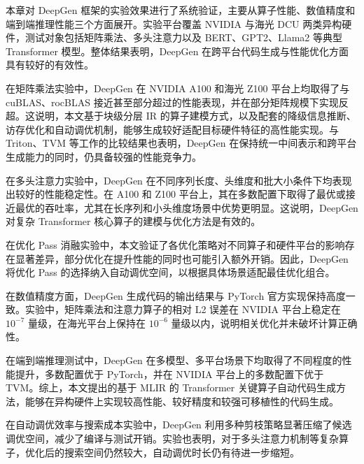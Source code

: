 本章对 DeepGen 框架的实验效果进行了系统验证，主要从算子性能、数值精度和端到端推理性能三个方面展开。实验平台覆盖 NVIDIA 与海光 DCU 两类异构硬件，测试对象包括矩阵乘法、多头注意力以及 BERT、GPT2、Llama2 等典型 Transformer 模型。整体结果表明，DeepGen 在跨平台代码生成与性能优化方面具有较好的有效性。

在矩阵乘法实验中，DeepGen 在 NVIDIA A100 和海光 Z100 平台上均取得了与 cuBLAS、rocBLAS 接近甚至部分超过的性能表现，并在部分矩阵规模下实现反超。这说明，本文基于块级分层 IR 的算子建模方式，以及配套的降级信息推断、访存优化和自动调优机制，能够生成较好适配目标硬件特征的高性能实现。与 Triton、TVM 等工作的比较结果也表明，DeepGen 在保持统一中间表示和跨平台生成能力的同时，仍具备较强的性能竞争力。

在多头注意力实验中，DeepGen 在不同序列长度、头维度和批大小条件下均表现出较好的性能稳定性。在 A100 和 Z100 平台上，其在多数配置下取得了最优或接近最优的吞吐率，尤其在长序列和小头维度场景中优势更明显。这说明，DeepGen 对复杂 Transformer 核心算子的建模与优化方法是有效的。

在优化 Pass 消融实验中，本文验证了各优化策略对不同算子和硬件平台的影响存在显著差异，部分优化在提升性能的同时也可能引入额外开销。因此，DeepGen 将优化 Pass 的选择纳入自动调优空间，以根据具体场景适配最佳优化组合。

在数值精度方面，DeepGen 生成代码的输出结果与 PyTorch 官方实现保持高度一致。实验中，矩阵乘法和注意力算子的相对 L2 误差在 NVIDIA 平台上稳定在 $10^{-7}$ 量级，在海光平台上保持在 $10^{-6}$ 量级以内，说明相关优化并未破坏计算正确性。

在端到端推理测试中，DeepGen 在多模型、多平台场景下均取得了不同程度的性能提升，多数配置优于 PyTorch，并在 NVIDIA 平台上的多数配置下优于 TVM。综上，本文提出的基于 MLIR 的 Transformer 关键算子自动代码生成方法，能够在异构硬件上实现较高性能、较好精度和较强可移植性的代码生成。

在自动调优效率与搜索成本实验中，DeepGen 利用多种剪枝策略显著压缩了候选调优空间，减少了编译与测试开销。实验也表明，对于多头注意力机制等复杂算子，优化后的搜索空间仍然较大，自动调优时长仍有待进一步缩短。
